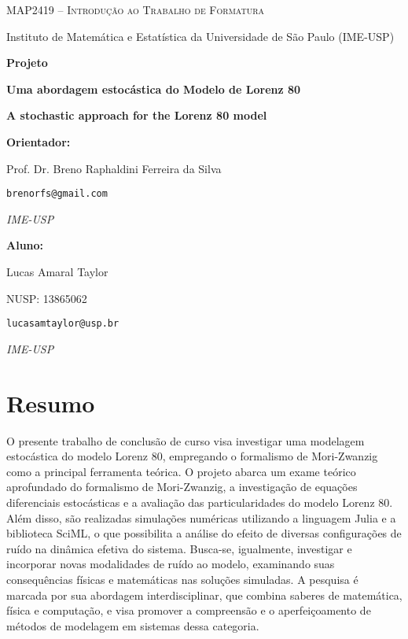 \documentclass[12pt]{article}
\begin{document}
\begin{titlepage}
    \centering
    {\Large\scshape MAP2419 -- Introdução ao Trabalho de Formatura \par}
    \vspace{0.3cm}
    {\large Instituto de Matemática e Estatística da Universidade de São Paulo (IME-USP)\par}
    
    \vspace{3cm}
    
    {\LARGE\bfseries Projeto\par}
    \vspace{1cm}
    {\LARGE\bfseries Uma abordagem estocástica do Modelo de Lorenz 80\par}
    \vspace{0.5em}
    {\large\bfseries A stochastic approach for the Lorenz 80 model\par}

    \vfill
    
    \begin{minipage}[t]{0.45\textwidth}
        \raggedright
        \textbf{Orientador:} \par
        Prof. Dr. Breno Raphaldini Ferreira da Silva  \par
        \texttt{brenorfs@gmail.com} \par
        \textit{IME-USP} \par\medskip
    \end{minipage}
    \hfill
    \begin{minipage}[t]{0.45\textwidth}
        \raggedright
        \textbf{Aluno:} \par
        Lucas Amaral Taylor \par
        NUSP: 13865062 \par
        \texttt{lucasamtaylor@usp.br} \par
        \textit{IME-USP}
    \end{minipage}
    \vspace{2cm}
\end{titlepage}

\newpage
\section*{Resumo}
O presente trabalho de conclusão de curso visa investigar uma modelagem estocástica do modelo Lorenz 80, empregando o formalismo de Mori-Zwanzig como a principal ferramenta teórica.  O projeto abarca um exame teórico aprofundado do formalismo de Mori-Zwanzig, a investigação de equações diferenciais estocásticas e a avaliação das particularidades do modelo Lorenz 80.  Além disso, são realizadas simulações numéricas utilizando a linguagem Julia e a biblioteca SciML, o que possibilita a análise do efeito de diversas configurações de ruído na dinâmica efetiva do sistema.  Busca-se, igualmente, investigar e incorporar novas modalidades de ruído ao modelo, examinando suas consequências físicas e matemáticas nas soluções simuladas.  A pesquisa é marcada por sua abordagem interdisciplinar, que combina saberes de matemática, física e computação, e visa promover a compreensão e o aperfeiçoamento de métodos de modelagem em sistemas dessa categoria.
\end{document}
